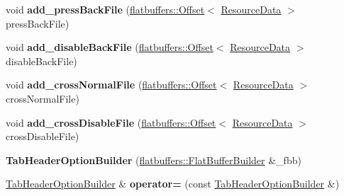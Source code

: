 \begin{DoxyCompactItemize}
\mbox{\label{structflatbuffers_1_1TabHeaderOptionBuilder_a263bfa5a1fd8ca0fb1eaecbaa3a3f049}} 
void {\bfseries add\+\_\+press\+Back\+File} (\hyperlink{structflatbuffers_1_1Offset}{flatbuffers\+::\+Offset}$<$ \hyperlink{structflatbuffers_1_1ResourceData}{Resource\+Data} $>$ press\+Back\+File)
\item 
\mbox{\label{structflatbuffers_1_1TabHeaderOptionBuilder_acd0e792a24c8fb382a4b2196ad886321}} 
void {\bfseries add\+\_\+disable\+Back\+File} (\hyperlink{structflatbuffers_1_1Offset}{flatbuffers\+::\+Offset}$<$ \hyperlink{structflatbuffers_1_1ResourceData}{Resource\+Data} $>$ disable\+Back\+File)
\item 
\mbox{\label{structflatbuffers_1_1TabHeaderOptionBuilder_a8dd5b1bd89ae14e0e66d68250aaea175}} 
void {\bfseries add\+\_\+cross\+Normal\+File} (\hyperlink{structflatbuffers_1_1Offset}{flatbuffers\+::\+Offset}$<$ \hyperlink{structflatbuffers_1_1ResourceData}{Resource\+Data} $>$ cross\+Normal\+File)
\item 
\mbox{\label{structflatbuffers_1_1TabHeaderOptionBuilder_ad3d1e17e056f992450696757c82832be}} 
void {\bfseries add\+\_\+cross\+Disable\+File} (\hyperlink{structflatbuffers_1_1Offset}{flatbuffers\+::\+Offset}$<$ \hyperlink{structflatbuffers_1_1ResourceData}{Resource\+Data} $>$ cross\+Disable\+File)
\item 
\mbox{\label{structflatbuffers_1_1TabHeaderOptionBuilder_aebf76697af86514939c2abda86a9b5f7}} 
{\bfseries Tab\+Header\+Option\+Builder} (\hyperlink{classflatbuffers_1_1FlatBufferBuilder}{flatbuffers\+::\+Flat\+Buffer\+Builder} \&\+\_\+fbb)
\item 
\mbox{\label{structflatbuffers_1_1TabHeaderOptionBuilder_a9b2a96e30c72d886e7af1c1f82549634}} 
\hyperlink{structflatbuffers_1_1TabHeaderOptionBuilder}{Tab\+Header\+Option\+Builder} \& {\bfseries operator=} (const \hyperlink{structflatbuffers_1_1TabHeaderOptionBuilder}{Tab\+Header\+Option\+Builder} \&)
\item 
\mbox{\label{structflatbuffers_1_1TabHeaderOptionBuilder_ab2376986983ccd2f839d982701a703d8}} 

\end{DoxyCompactItemize}
